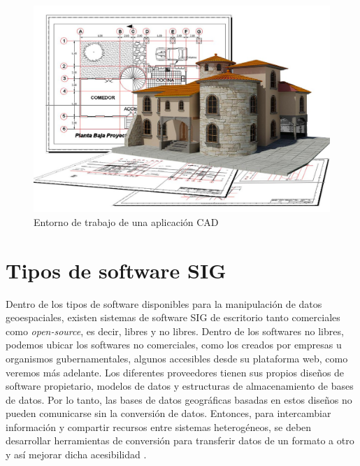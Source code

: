 \begin{figure}[H]
	\centering
	\includegraphics[width=0.75\linewidth]{imagenes/capitulo2/C4nMJdNWcAAoub7}
	\caption{Entorno de trabajo de una aplicación CAD  \cite{sig-cad}}
	\label{fig:c4nmjdnwcaaoub7}
\end{figure}


\section{Tipos de software SIG}

Dentro de los tipos de software disponibles para la manipulación de datos geoespaciales, existen sistemas de software SIG de escritorio tanto comerciales como \textit{open-source}, es decir, libres y no libres. Dentro de los softwares no libres, podemos ubicar los softwares no comerciales, como los creados por empresas u organismos gubernamentales, algunos accesibles desde su plataforma web, como veremos más adelante. Los diferentes proveedores tienen sus propios diseños de software propietario, modelos de datos y estructuras de almacenamiento de bases de datos. Por lo tanto, las bases de datos geográficas basadas en estos diseños no pueden comunicarse sin la conversión de datos. Entonces, para intercambiar información y compartir recursos entre sistemas heterogéneos, se deben desarrollar herramientas de conversión para transferir datos de un formato a otro y así mejorar dicha acesibilidad \cite{libro-gis}. \\


